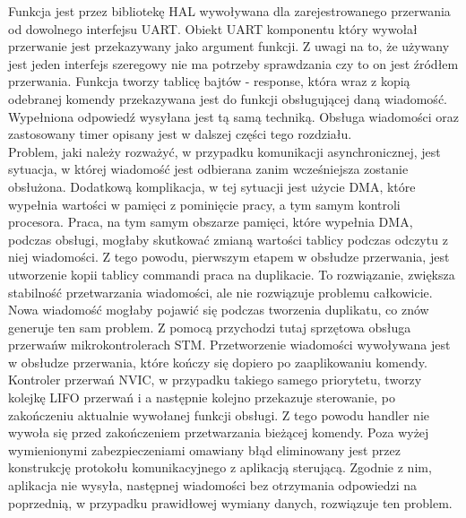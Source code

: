 \documentclass[eng,printmode]{mgr}
\begin{document}
Funkcja jest przez bibliotekę HAL wywoływana dla zarejestrowanego przerwania od dowolnego interfejsu UART. Obiekt UART komponentu który wywołał przerwanie jest przekazywany jako argument funkcji. Z uwagi na to, że używany jest jeden interfejs szeregowy nie ma potrzeby sprawdzania czy to on jest źródłem przerwania. Funkcja tworzy tablicę bajtów - response, która wraz z kopią odebranej komendy przekazywana jest do funkcji obsługującej daną wiadomość. Wypełniona odpowiedź wysyłana jest tą samą techniką. Obsługa wiadomości oraz zastosowany timer opisany jest w dalszej części tego rozdziału.
\\Problem, jaki należy rozważyć, w przypadku komunikacji asynchronicznej, jest sytuacja, w której wiadomość jest odbierana zanim wcześniejsza zostanie obsłużona. Dodatkową komplikacja, w tej sytuacji jest użycie DMA, które wypełnia wartości w pamięci z pominięcie pracy, a tym samym kontroli procesora. Praca, na tym samym obszarze pamięci, które wypełnia DMA, podczas obsługi, mogłaby skutkować zmianą wartości tablicy podczas odczytu z niej wiadomości. Z tego powodu, pierwszym etapem w obsłudze przerwania, jest utworzenie kopii tablicy commandi praca na duplikacie. To rozwiązanie, zwiększa stabilność przetwarzania wiadomości, ale nie rozwiązuje problemu całkowicie. Nowa wiadomość mogłaby pojawić się podczas tworzenia duplikatu, co znów generuje ten sam problem. Z pomocą przychodzi tutaj sprzętowa obsługa przerwańw mikrokontrolerach STM. Przetworzenie wiadomości wywoływana jest w obsłudze przerwania, które kończy się dopiero po zaaplikowaniu komendy. Kontroler przerwań NVIC, w przypadku takiego samego priorytetu, tworzy kolejkę LIFO przerwań i a następnie kolejno przekazuje sterowanie, po zakończeniu aktualnie wywołanej funkcji obsługi. Z tego powodu handler nie wywoła się przed zakończeniem przetwarzania bieżącej komendy. Poza wyżej wymienionymi zabezpieczeniami omawiany błąd eliminowany jest przez konstrukcję protokołu komunikacyjnego z aplikacją sterującą. Zgodnie z nim, aplikacja nie wysyła, następnej wiadomości bez otrzymania odpowiedzi na poprzednią, w przypadku prawidłowej wymiany danych, rozwiązuje ten problem.
\end{document}
